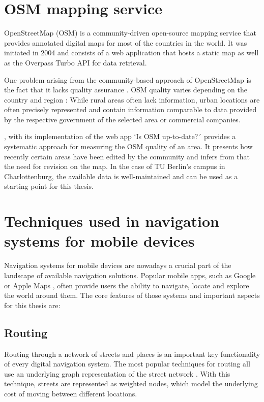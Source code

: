 \section{OSM mapping service}
OpenStreetMap (OSM) is a community-driven open-source mapping service that provides annotated digital maps for most of the countries in the world. It was initiated in 2004 and consists of a web application \cite{openstreetmap_website} that hosts a static map as well as the Overpass Turbo API \cite{openstreetmap_overpass_turbo} for data retrieval.

One problem arising from the community-based approach of OpenStreetMap is the fact that it lacks quality assurance \cite{quality_of_openstreetmap}. OSM quality varies depending on the country and region \cite{quality_of_openstreetmap}: While rural areas often lack information, urban locations are often precisely represented and contain information comparable to data provided by the respective government of the selected area or commercial companies.

\cite{quality_of_openstreetmap}, with its implementation of the web app `Is OSM up-to-date?´ provides a systematic approach for measuring the OSM quality of an area. It presents how recently certain areas have been edited by the community and infers from that the need for revision on the map. In the case of TU Berlin's campus in Charlottenburg, the available data is well-maintained \cite{is_osm_up_to_date} and can be used as a starting point for this thesis.

\section{Techniques used in navigation systems for mobile devices}
Navigation systems for mobile devices are nowadays a crucial part of the landscape of available navigation solutions. Popular mobile apps, such as Google \cite{google_maps_website} or Apple Maps \cite{apple_maps_website}, often provide users the ability to navigate, locate and explore the world around them. The core features of those systems and important aspects for this thesis are:

\subsection{Routing}
Routing through a network of streets and places is an important key functionality of every digital navigation system. The most popular techniques for routing all use an underlying graph representation of the street network \cite{google_maps}. With this technique, streets are represented as weighted nodes, which model the underlying cost of moving between different locations.

